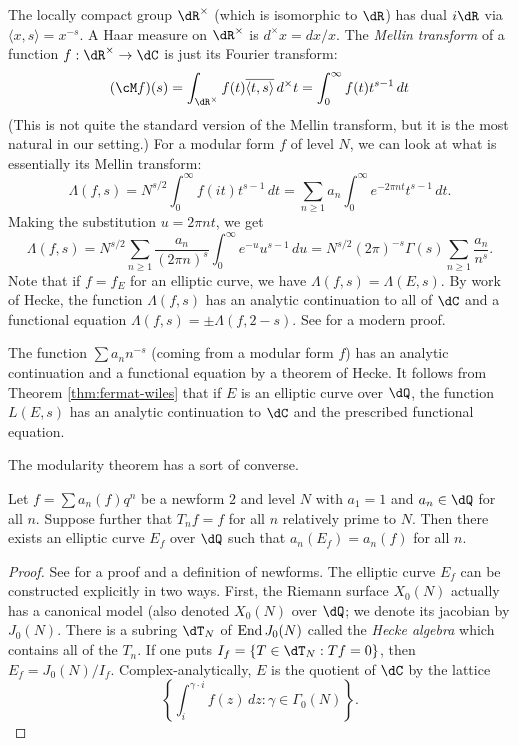 The locally compact group $\dR^\times$ (which is isomorphic to $\dR$) has 
dual $i\dR$ via $\langle x,s\rangle = x^{-s}$. A Haar measure on 
$\dR^\times$ is $d^\times x=dx/x$. The \emph{Mellin transform} 
of a function $f:\dR^\times\to \dC$ is just its Fourier transform:
\[
  (\cM f)(s) 
    = \int_{\dR^\times} f(t) \overline{\langle t,s\rangle}\, d^\times t
    = \int_0^\infty f(t) t^{s-1}\, dt
\]
(This is not quite the standard version of the Mellin transform, but it is the 
most natural in our setting.) For a modular form $f$ of level $N$, we can look 
at what is essentially its Mellin transform: 
\[
  \Lambda(f,s) 
    = N^{s/2}\int_0^\infty f(i t) t^{s-1}\, dt  
    = \sum_{n\geqslant 1} a_n \int_0^\infty e^{-2\pi n t} t^{s-1}\,dt \text{.}
\]
Making the substitution $u=2\pi n t$, we get 
\[
  \Lambda(f,s) 
    = N^{s/2} \sum_{n\geqslant 1} \frac{a_n}{(2\pi n)^s} \int_0^\infty e^{-u} u^{s-1}\, du
    = N^{s/2}(2\pi)^{-s} \Gamma(s) \sum_{n\geqslant 1} \frac{a_n}{n^s} \text{.}
\]
Note that if $f=f_E$ for an elliptic curve, we have 
$\Lambda(f,s) = \Lambda(E,s)$. By work of Hecke, the function $\Lambda(f,s)$ 
has an analytic continuation to all of $\dC$ and a functional equation 
$\Lambda(f,s) = \pm \Lambda(f,2-s)$. See \cite[VII.9.8]{kn92} for a modern 
proof.  


The function $\sum a_n n^{-s}$ (coming from a modular form $f$) has an analytic 
continuation and a functional equation by a theorem of Hecke. It follows from 
Theorem \ref{thm:fermat-wiles} that if $E$ is an elliptic curve over $\dQ$, 
the function $L(E,s)$ has an analytic continuation to $\dC$ and the prescribed 
functional equation. 

The modularity theorem has a sort of converse. 

\begin{theorem}
Let $f=\sum a_n(f) q^n$ be a newform $2$ and level $N$ with 
$a_1=1$ and $a_n\in \dQ$ for all $n$. Suppose further that 
$T_n f = f$ for all $n$ relatively prime to $N$. Then there exists an 
elliptic curve $E_f$ over $\dQ$ such that $a_n(E_f) = a_n(f)$ for all $n$. 
\end{theorem}
\begin{proof}
See \cite[XI.11]{kn92} for a proof and a definition of newforms. The elliptic 
curve $E_f$ can be constructed explicitly in two ways. First, the Riemann 
surface $X_0(N)$ actually has a canonical model (also denoted $X_0(N)$ over 
$\dQ$; we denote its jacobian by $J_0(N)$. There is a subring $\dT_N$ of 
$\operatorname{End} J_0(N)$ called the \emph{Hecke algebra} which contains all of the 
$T_n$. If one puts $I_f = \{T\in \dT_N:T f=0\}$, then 
$E_f=J_0(N)/I_f$. Complex-analytically, $E$ is the quotient of $\dC$ by 
the lattice 
\[
  \left\{ \int_i^{\gamma\cdot i} f(z)\, dz : \gamma\in \Gamma_0(N)\right\} \text{.}
\]
\end{proof}






